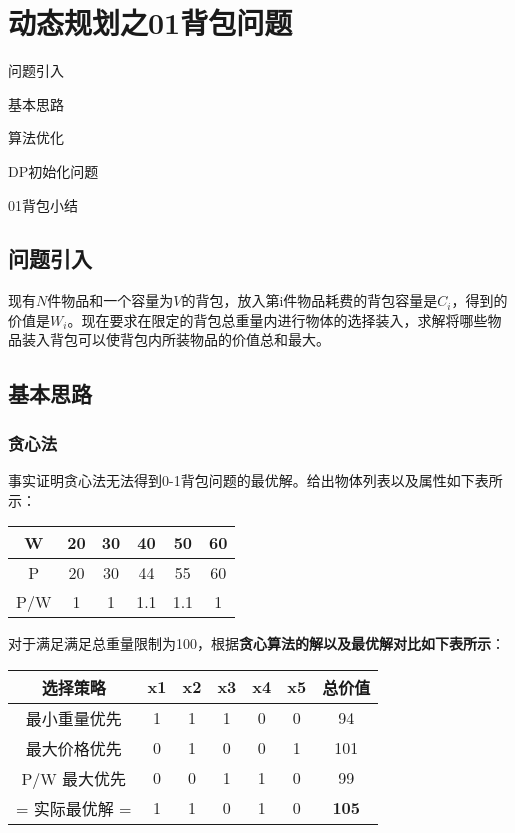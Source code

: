 \chapter{动态规划之01背包问题}

\begin{introduction}
	\item 问题引入
	\item 基本思路
	\item 算法优化
	\item DP初始化问题
	\item 01背包小结
\end{introduction}

\section{问题引入}
现有$N$件物品和一个容量为$V$的背包，放入第i件物品耗费的背包容量是$C_i$，得到的价值是$W_i$。现在要求在限定的背包总重量内进行物体的选择装入，求解将哪些物品装入背包可以使背包内所装物品的价值总和最大。
\section{基本思路}

\subsection{贪心法}
事实证明贪心法无法得到0-1背包问题的最优解。给出物体列表以及属性如下表所示：

\begin{center}
\begin{tabular}{cccccc}
\toprule  %
W& 20& 30& 40& 50& 60\\
\midrule  %
P& 20& 30& 44& 55& 60\\
P/W& 1& 1& 1.1& 1.1& 1\\
\bottomrule %
\end{tabular}
\end{center}

对于满足满足总重量限制为100，根据\textbf{贪心算法的解以及最优解对比如下表所示}：

\begin{center}
\begin{tabular}{ccccccc}
\toprule  %
选择策略& x1& x2& x3& x4& x5& 总价值\\
\midrule  %
最小重量优先& 1& 1& 1& 0& 0& 94\\
最大价格优先& 0& 1& 0& 0& 1& 101\\
P/W 最大优先& 0& 0& 1& 1& 0& 99\\
= 实际最优解 =& 1& 1& 0& 1& 0& \textbf{105}\\ 
\bottomrule %
\end{tabular}
\end{center}

